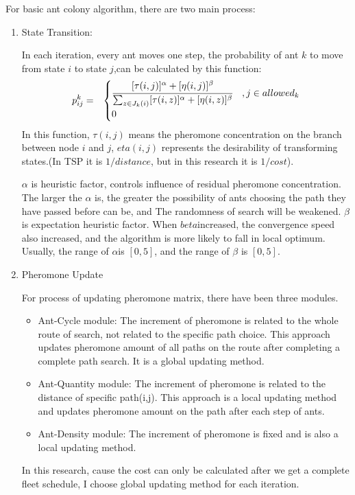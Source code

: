 \documentclass[senior]{IPSstyle}
\begin{document}
For basic ant colony algorithm, there are two main process:
\begin{enumerate}
    \item State Transition:
    
    In each iteration, every ant moves one step, the probability of ant \(k\) to move from state \(i\) to state \(j\),can be calculated by this function:
    \begin{eqnarray}
    p_{ij}^k &=&
    \begin{cases}
    \cfrac{[\tau(i,j)]^\alpha +[\eta(i,j)]^\beta}{\sum_{z\in J_k(i)} [\tau(i,z)]^\alpha +[\eta(i,z)]^\beta} &, j\in allowed_k \cr
    0 \cr
    \end{cases}
    \end{eqnarray}
    In this function, \(\tau(i,j)\) means the pheromone concentration on the branch between node \(i\) and \(j\), \(eta(i,j)\) represents the desirability of transforming states.(In TSP it is \(1/distance\), but in this research it is \(1/cost\)). 
    
    \(\alpha\) is heuristic factor, controls influence of residual pheromone concentration. The larger the \(\alpha\) is, the greater the possibility of ants choosing the path they have passed before can be, and The randomness of search will be weakened. \(\beta\) is expectation heuristic factor. When \(beta\)increased, the convergence speed also increased, and the algorithm is more likely to fall in local optimum. 
    Usually, the range of \(\alpha\)is \([0,5]\), and the range of \(\beta\) is  \([0,5]\).
    \item Pheromone Update
    
    For process of updating pheromone matrix, there have been three modules.
    \begin{itemize}
        \item Ant-Cycle module:  The increment of pheromone is related to the whole route of search, not related to the specific path choice. This approach updates pheromone amount of all paths on the route after completing a complete path search. It is a global updating method.
        \item Ant-Quantity module: The increment of pheromone is related to the distance of specific path(i,j). This approach is a local updating method and updates pheromone amount on the path after each step of ants.
        \item Ant-Density module: The increment of pheromone is fixed and is also a local updating method.
    \end{itemize}
    In this research, cause the cost can only be calculated after we get a complete fleet schedule, I choose global updating method for each iteration.
    

\end{enumerate}
\end{document}
